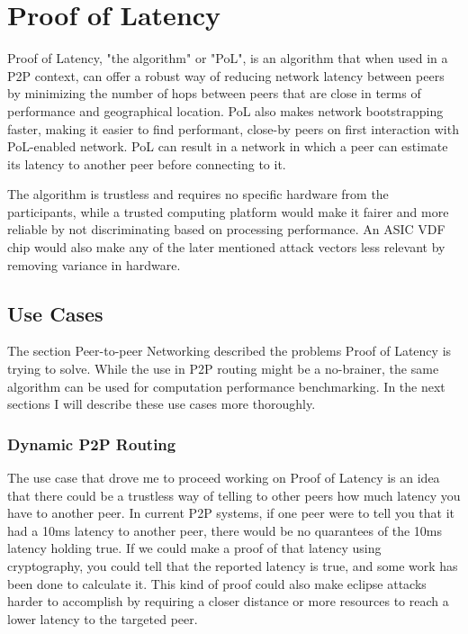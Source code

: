 \chapter{Proof of Latency}
\label{Proof of Latency}
Proof of Latency, "the algorithm" or "PoL", is an algorithm that when used in a P2P context, can offer a robust way of reducing network latency between peers by minimizing the number of hops between peers that are close in terms of performance and geographical location. PoL also makes network bootstrapping faster, making it easier to find performant, close-by peers on first interaction with PoL-enabled network. PoL can result in a network in which a peer can estimate its latency to another peer before connecting to it.

The algorithm is trustless and requires no specific hardware from the participants, while a trusted computing platform would make it fairer and more reliable by not discriminating based on processing performance. An ASIC VDF chip would also make any of the later mentioned attack vectors less relevant by removing variance in hardware.

\section{Use Cases}
The section Peer-to-peer Networking described the problems Proof of Latency is trying to solve. While the use in P2P routing might be a no-brainer, the same algorithm can be used for computation performance benchmarking. In the next sections I will describe these use cases more thoroughly.

\subsection{Dynamic P2P Routing}
The use case that drove me to proceed working on Proof of Latency is an idea that there could be a trustless way of telling to other peers how much latency you have to another peer. In current P2P systems, if one peer were to tell you that it had a 10ms latency to another peer, there would be no quarantees of the 10ms latency holding true. If we could make a proof of that latency using cryptography, you could tell that the reported latency is true, and some work has been done to calculate it. This kind of proof could also make eclipse attacks harder to accomplish by requiring a closer distance or more resources to reach a lower latency to the targeted peer.


